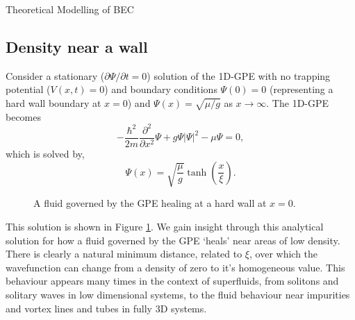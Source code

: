 \begin{chapter}{\label{cha:theoretical_model}Theoretical Modelling of BEC}
	\subsection{\label{section:wall} Density near a wall}
	Consider a stationary ($\partial \Psi / \partial t = 0$) solution of the 1D-GPE with no trapping potential ($V(x,t)=0$) and boundary conditions $\Psi(0)=0$ (representing a hard wall boundary at $x=0$) and $\Psi(x)=\sqrt{\mu/g}$ as $x\rightarrow\infty$. The 1D-GPE becomes
	\begin{equation}
		-\frac{\hbar^2 }{2m}\frac{\partial^2}{\partial x^2}\Psi + g\Psi|\Psi|^2 - \mu\Psi = 0,
	\end{equation}
	which is solved by,
	\begin{equation}
		\Psi(x) = \sqrt{\frac{\mu}{g}}\tanh \left( \frac{x}{\xi} \right).
	\end{equation}
	\begin{figure}[!ht]
	\centering
  \caption{A fluid governed by the GPE healing at a hard wall at $x=0$.}\label{fig_wallsoln}
 \end{figure}
	This solution is shown in Figure \ref{fig_wallsoln}. We gain insight through this analytical solution for how a fluid governed by the GPE `heals' near areas of low density. There is clearly a natural minimum distance, related to $\xi$, over which the wavefunction can change from a density of zero to it's homogeneous value. This behaviour appears many times in the context of superfluids, from solitons and solitary waves in low dimensional systems, to the fluid behaviour near impurities and vortex lines and tubes in fully 3D systems. 


\end{chapter}
